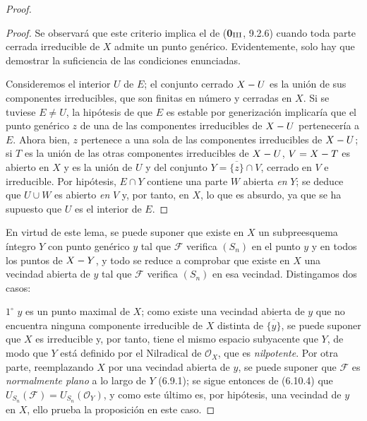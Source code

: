 \begin{proof}
\begin{proof}
Se observará que este criterio implica el de (\textbf{0}$_{\rm III}$, 9.2.6)
cuando toda parte cerrada irreducible de $X$ admite un punto genérico.
Evidentemente, solo hay que demostrar la suficiencia de las condiciones enunciadas.

Consideremos el interior $U$ de $E$; el conjunto cerrado $X- U$ es la unión de
sus componentes irreducibles, que son finitas en número y cerradas en $X$.
Si se tuviese $E\ne U$, la hipótesis de que $E$ es estable por generización
implicaría que el punto genérico $z$ de una de las componentes irreducibles
de $X- U$ pertenecería a $E$. Ahora bien, $z$ pertenece a una sola de las
componentes irreducibles de $X- U$; si $T$ es la unión de las otras
componentes irreducibles de $X- U$, $V=X- T$ es abierto en $X$ y es la unión de
$U$ y del conjunto $Y=\overline{\{z\}}\cap V$, cerrado en $V$ e
irreducible. Por hipótesis, $E\cap Y$ contiene una parte $W$ abierta \emph{en}
$Y$; se deduce que $U\cup W$ es abierto \emph{en} $V$ y, por tanto, en $X$, lo que
es absurdo, ya que se ha supuesto que $U$ es el interior de $E$.
\end{proof}

En virtud de este lema, se puede suponer que existe en $X$ un
subpreesquema íntegro $Y$ con punto genérico $y$ tal que $\mathcal F$
verifica $(S_n)$ en el punto $y$ y en todos los puntos de $X- Y$, y todo se
reduce a comprobar que existe en $X$ una vecindad abierta de $y$ tal que
$\mathcal F$ verifica $(S_n)$ en esa vecindad. Distingamos dos casos:

$1^\circ$ $y$ es un punto maximal de $X$; como existe una vecindad abierta
de $y$ que no encuentra ninguna componente irreducible de $X$ distinta de
$\overline{\{y\}}$, se puede suponer que $X$ es irreducible y, por tanto, tiene el mismo
espacio subyacente que $Y$, de modo que $Y$ está definido por el Nilradical de
$\mathcal O_X$, que es \emph{nilpotente}. Por otra parte, reemplazando $X$
por una vecindad abierta de $y$, se puede suponer que $\mathcal F$ es \emph{normalmente
plano} a lo largo de $Y$ (6.9.1); se sigue entonces de (6.10.4) que
$U_{S_n}(\mathcal F)=U_{S_n}(\mathcal O_Y)$, y como este último es, por
hipótesis, una vecindad de $y$ en $X$, ello prueba la proposición en este
caso.



\end{proof}
